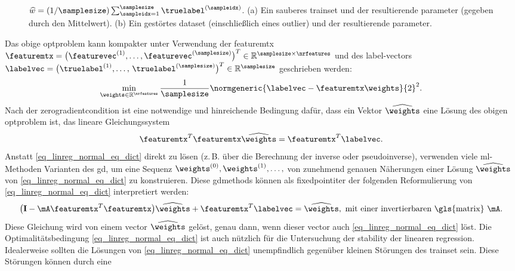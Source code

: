 {{{{{{\begin{figure}[H]
{		 $\widehat{w} = (1/\samplesize) \sum_{\sampleidx=1}^{\samplesize} \truelabel^{(\sampleidx)}$. 
		(a) Ein sauberes \gls{trainset} und der resultierende \gls{parameter} (gegeben durch den Mittelwert). 
		 (b) Ein gestörtes \gls{dataset} (einschließlich eines \gls{outlier}) 
		 und der resultierende \gls{parameter}. \label{fig_linreg_dict}}
		 \end{figure}
		Das obige \gls{optproblem} kann kompakter unter Verwendung der 
		 \gls{featuremtx} $\featuremtx = \big(\featurevec^{(1)},\ldots,\featurevec^{(\samplesize)}\big)^{T} \in \mathbb{R}^{\samplesize \times \nrfeatures}$ 
		und des \gls{label}-\gls{vector}s $\labelvec = \big( \truelabel^{(1)},\ldots, \,\truelabel^{(\samplesize)} \big)^{T} \in \mathbb{R}^{\samplesize}$ 
		geschrieben werden:
		 $$\min_{\weights \in \mathbb{R}^{\nrfeatures}} \frac{1}{\samplesize} \normgeneric{\labelvec - \featuremtx \weights}{2}^{2}.$$
		 Nach der \gls{zerogradientcondition} ist eine notwendige und hinreichende Bedingung dafür, dass ein 
		 Vektor $\widehat{\weights}$ eine Lösung des obigen \gls{optproblem} ist, das lineare Gleichungssystem \cite{StrangLinAlg2016}
		 \begin{equation} 
			\label{eq_linreg_normal_eq_dict}
			\featuremtx^{T}\featuremtx \widehat{\weights} = \featuremtx^{T} \labelvec.
		 \end{equation}
		 Anstatt \eqref{eq_linreg_normal_eq_dict} direkt zu lösen 
		 (z. B. über die Berechnung der \gls{inverse} oder \gls{pseudoinverse}), 
		 verwenden viele \gls{ml}-Methoden Varianten des \gls{gd}, um eine Sequenz 
		 $\weights^{(0)},\weights^{(1)},\ldots,$ von zunehmend genauen Näherungen 
		 einer Lösung $\widehat{\weights}$ von \eqref{eq_linreg_normal_eq_dict} zu konstruieren. Diese 
		 \glspl{gdmethod} können als \gls{fixedpointiter} der folgenden 
		 Reformulierung von \eqref{eq_linreg_normal_eq_dict} interpretiert werden: 
		 $$ \big(\mathbf{I} - \mA \featuremtx^{T}\featuremtx\big) \widehat{\weights} + \featuremtx^{T} 
		 \labelvec = \widehat{\weights}, \mbox{ mit einer invertierbaren \gls{matrix} } \mA.$$
		 Diese Gleichung wird von einem \gls{vector} $\widehat{\weights}$ gelöst, genau dann, wenn 
		 dieser \gls{vector} auch \eqref{eq_linreg_normal_eq_dict} löst. Die Optimalitätsbedingung 
		 \eqref{eq_linreg_normal_eq_dict} ist auch nützlich für die Untersuchung der 
		 \gls{stability} der linearen \gls{regression}. Idealerweise sollten die Lösungen von 
		 \eqref{eq_linreg_normal_eq_dict} unempfindlich gegenüber kleinen Störungen 
		 des \gls{trainset} sein. Diese Störungen können durch eine 
}}}}}}

